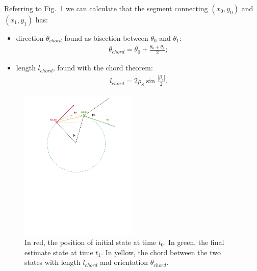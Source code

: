 \begin{itemize}
Referring to Fig.~\ref{fig:chord} we can calculate that the segment connecting $(x_0,y_0)$ and $(x_1,y_1)$ has:
\begin{itemize}
\item direction $\theta_{chord}$ found as bisection between $\theta_0$ and $\theta_1$:
 \begin{align}
 \theta_{chord} = \theta_0 + \frac{\theta_0 + \theta_1}{2} ;
 \label{eq:anglechord}
 \end{align}
\item length $l_{chord}$, found with the chord theorem:
\begin{align}
 l_{chord} = 2\rho_8\sin{\frac{|\beta_s|}{2}}.
  \label{eq:lengthchord}
 \end{align}
\end{itemize}
\begin{figure}[!htbp]
    \centering
    \includegraphics[width=0.5\textwidth]{img/chord.pdf}
    \caption{In red, the position of initial state at time $t_0$. In green, the final estimate state at time $t_1$. In yellow, the chord between the two states with length $l_{chord}$ and orientation $\theta_{chord}$.}
    \label{fig:chord}
\end{figure}


\end{itemize}
